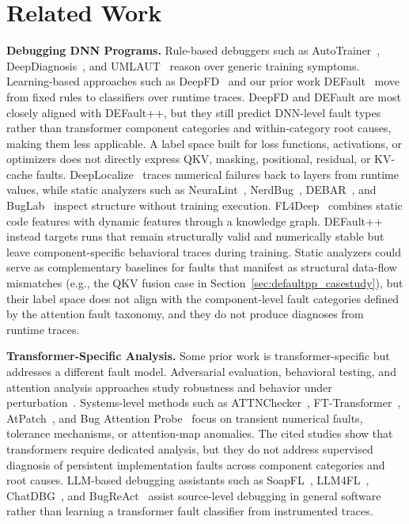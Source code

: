 \section{Related Work}
\label{sec:defaultpp_related}

\textbf{Debugging DNN Programs.}
Rule-based debuggers such as AutoTrainer~\cite{autotrainer}, DeepDiagnosis~\cite{deepdiagnosis}, and UMLAUT~\cite{umlaut} reason over generic training symptoms. Learning-based approaches such as DeepFD~\cite{deepfd} and our prior work DEFault~\cite{default} move from fixed rules to classifiers over runtime traces. DeepFD and DEFault are most closely aligned with DEFault++, but they still predict DNN-level fault types rather than transformer component categories and within-category root causes, making them less applicable. A label space built for loss functions, activations, or optimizers does not directly express QKV, masking, positional, residual, or KV-cache faults. DeepLocalize~\cite{deeplocalize} traces numerical failures back to layers from runtime values, while static analyzers such as NeuraLint~\cite{NeuraLint}, NerdBug~\cite{nerdbug}, DEBAR~\cite{debar}, and BugLab~\cite{buglab} inspect structure without training execution. FL4Deep~\cite{fl4deep} combines static code features with dynamic features through a knowledge graph. DEFault++ instead targets runs that remain structurally valid and numerically stable but leave component-specific behavioral traces during training. Static analyzers could serve as complementary baselines for faults that manifest as structural data-flow mismatches (e.g., the QKV fusion case in Section~\ref{sec:defaultpp_casestudy}), but their label space does not align with the component-level fault categories defined by the attention fault taxonomy, and they do not produce diagnoses from runtime traces.

\textbf{Transformer-Specific Analysis.}
Some prior work is transformer-specific but addresses a different fault model. Adversarial evaluation, behavioral testing, and attention analysis approaches study robustness and behavior under perturbation~\cite{jones2020adversarial,ribeiro2020checklist,clark2019does,voita2019analyzing}. Systems-level methods such as ATTNChecker~\cite{liang2025attnchecker}, FT-Transformer~\cite{fttransformer}, AtPatch~\cite{atpatch2026}, and Bug Attention Probe~\cite{bap2025} focus on transient numerical faults, tolerance mechanisms, or attention-map anomalies. The cited studies show that transformers require dedicated analysis, but they do not address supervised diagnosis of persistent implementation faults across component categories and root causes. LLM-based debugging assistants such as SoapFL~\cite{soapfl2025}, LLM4FL~\cite{llm4fl2024}, ChatDBG~\cite{chatdbg2025}, and BugReAct~\cite{bugreact2026} assist source-level debugging in general software rather than learning a transformer fault classifier from instrumented traces.


